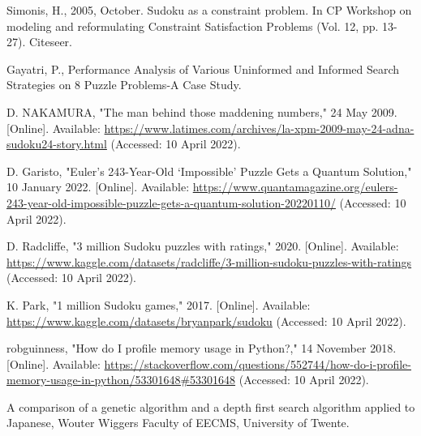 \begin{thebibliography}{1}

 Simonis, H., 2005, October. Sudoku as a constraint problem. In CP Workshop on modeling and reformulating Constraint Satisfaction Problems (Vol. 12, pp. 13-27). Citeseer.
\linebreak

	Gayatri, P., Performance Analysis of Various Uninformed and Informed Search Strategies on 8 Puzzle Problems-A Case Study.
\linebreak



	D. NAKAMURA, "The man behind those maddening numbers," 24 May 2009. [Online]. Available: \url{https://www.latimes.com/archives/la-xpm-2009-may-24-adna-sudoku24-story.html} (Accessed: 10 April 2022).
\linebreak

 D. Garisto, "Euler’s 243-Year-Old ‘Impossible’ Puzzle Gets a Quantum Solution," 10 January 2022. [Online]. Available: \url{https://www.quantamagazine.org/eulers-243-year-old-impossible-puzzle-gets-a-quantum-solution-20220110/} (Accessed: 10 April 2022).

 D. Radcliffe, "3 million Sudoku puzzles with ratings," 2020. [Online]. Available: \url{https://www.kaggle.com/datasets/radcliffe/3-million-sudoku-puzzles-with-ratings} (Accessed: 10 April 2022).

 K. Park, "1 million Sudoku games," 2017. [Online]. Available: \url{https://www.kaggle.com/datasets/bryanpark/sudoku} (Accessed: 10 April 2022).

 robguinness, "How do I profile memory usage in Python?," 14 November 2018. [Online]. Available: \url{https://stackoverflow.com/questions/552744/how-do-i-profile-memory-usage-in-python/53301648#53301648} (Accessed: 10 April 2022).

A comparison of a genetic algorithm and a depth first
search algorithm applied to Japanese, Wouter Wiggers
Faculty of EECMS, University of Twente.

\end{thebibliography}